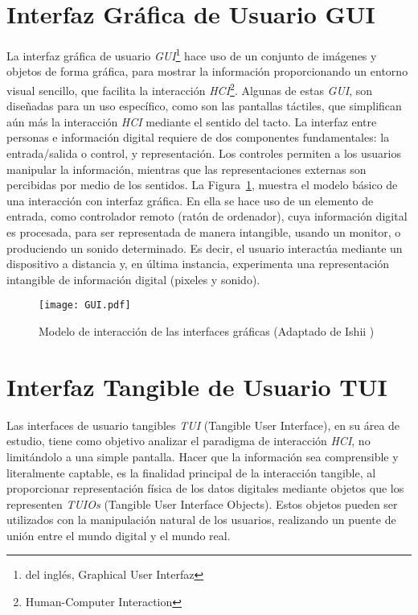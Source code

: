 \section{Interfaz Gráfica de Usuario GUI}
La interfaz gráfica de usuario \emph{GUI}\footnote{del inglés, Graphical User Interfaz} hace uso de un conjunto de imágenes y objetos de forma gráfica, para mostrar la información proporcionando un entorno visual sencillo, que facilita la interacción \emph{HCI}\footnote{Human-Computer Interaction}. Algunas de estas \emph{GUI}, son diseñadas para un uso específico, como son las pantallas táctiles, que simplifican aún más la interacción \emph{HCI} mediante el sentido del tacto.
La interfaz entre personas e información digital requiere de dos componentes fundamentales: la entrada/salida o control, y representación. Los controles permiten a los usuarios manipular la información, mientras que las representaciones externas son percibidas por medio de los sentidos. La Figura~\ref{fig:GUI}, muestra el modelo básico de una interacción con interfaz gráfica. En ella se hace uso de un elemento de entrada, como controlador remoto (ratón de ordenador), cuya información digital es procesada, para ser representada de manera intangible, usando un monitor, o produciendo un sonido determinado. Es decir, el usuario interactúa mediante un dispositivo a distancia y, en última instancia, experimenta una representación intangible de información digital (pixeles y sonido).

\begin{figure}[!h]
\begin{center}
\texttt{[image: GUI.pdf]}
\caption{Modelo de interacción de las interfaces gráficas (Adaptado de Ishii \cite{Ishii})}
\label{fig:GUI}
\end{center}
\end{figure}

\section{Interfaz Tangible de Usuario TUI}
Las interfaces de usuario tangibles \emph{TUI} (Tangible User Interface), en su área de estudio, tiene como objetivo analizar el paradigma de interacción \emph{HCI}, no limitándolo a una simple pantalla. Hacer que la información sea comprensible y literalmente captable, es la finalidad principal de la interacción tangible, al proporcionar representación física de los datos digitales mediante objetos que los representen \emph{TUIOs} (Tangible User Interface Objects). Estos objetos pueden ser utilizados con la manipulación natural de los usuarios, realizando un puente de unión entre el mundo digital y el mundo real.

